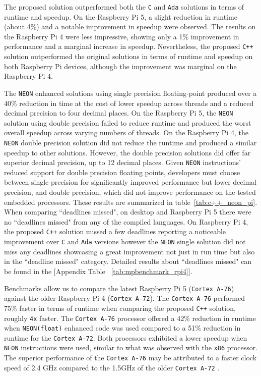 
The proposed solution outperformed both the \texttt{C} and \texttt{Ada} solutions in terms of runtime and speedup. On the Raspberry Pi 5, a slight reduction in runtime (about 4\%) and a notable improvement in speedup were observed. The results on the Raspberry Pi 4 were less impressive, showing only a 1\% improvement in performance and a marginal increase in speedup. Nevertheless, the proposed \texttt{C++} solution outperformed the original solutions in terms of runtime and speedup on both Raspberry Pi devices, although the improvement was marginal on the Raspberry Pi 4.

The \texttt{NEON} enhanced solutions using single precision floating-point produced over a 40\% reduction in time at the cost of lower speedup across threads and a reduced decimal precision to four decimal places. On the Raspberry Pi 5, the \texttt{NEON} solution using double precision failed to reduce runtime and produced the worst overall speedup across varying numbers of threads. On the Raspberry Pi 4, the \texttt{NEON} double precision solution did not reduce the runtime and produced a similar speedup to other solutions. However, the double precision solutions did offer far superior decimal precision, up to 12 decimal places. Given \texttt{NEON} instructions' reduced support for double precision floating points, developers must choose between single precision for significantly improved performance but lower decimal precision, and double precision, which did not improve performance on the tested embedded processors. These results are summarized in table~\ref{tab:c++_neon_pi}. When comparing ``deadlines missed", on desktop and Raspberry Pi 5 there were no ``deadlines missed" from any of the compiled languages. On Raspberry Pi 4, the proposed \texttt{C++} solution missed a few deadlines reporting a noticeable improvement over \texttt{C} and \texttt{Ada} versions however the \texttt{NEON} single solution did not miss any deadlines showcasing a great improvement not just in run time but also in the ``deadline missed" category. Detailed results about ``deadlines missed" can be found in the [Appendix Table ~\ref{tab:mpbenchmark_rpi4}].

Benchmarks allow us to compare the latest Raspberry Pi 5 (\texttt{Cortex A-76}) against the older Raspberry Pi 4 (\texttt{Cortex A-72}). The \texttt{Cortex A-76} performed 75\% faster in terms of runtime when comparing the proposed \texttt{C++} solution, roughly \texttt{4x} faster. The \texttt{Cortex A-76} processor offered a 42\% reduction in runtime when \texttt{NEON(float)} enhanced code was used compared to a 51\% reduction in runtime for the \texttt{Cortex A-72}. Both processors exhibited a lower speedup when \texttt{NEON} instructions were used, similar to what was observed with the \texttt{x86} processor. The superior performance of the \texttt{Cortex A-76} may be attributed to a faster clock speed of 2.4 GHz compared to the 1.5GHz of the older \texttt{Cortex A-72} \cite{rasp_pi5_pi4_comparision}.

